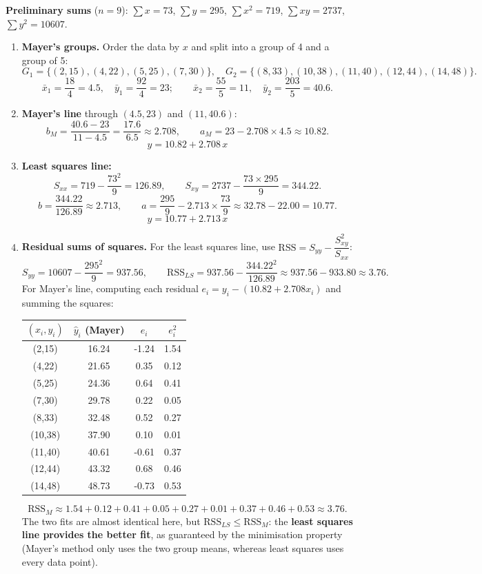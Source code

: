 \documentclass[11pt]{article}
\begin{document}
\begin{corrige}
\textbf{Preliminary sums} ($n = 9$): $\sum x = 73$, $\sum y = 295$, $\sum x^2 = 719$, $\sum xy = 2737$, $\sum y^2 = 10607$.
\begin{enumerate}
\item \textbf{Mayer's groups.} Order the data by $x$ and split into a group of 4 and a group of 5:
\[
G_1 = \{(2,15),(4,22),(5,25),(7,30)\}, \quad G_2 = \{(8,33),(10,38),(11,40),(12,44),(14,48)\}.
\]
\[
\bar{x}_1 = \frac{18}{4} = 4.5,\quad \bar{y}_1 = \frac{92}{4} = 23; \qquad
\bar{x}_2 = \frac{55}{5} = 11,\quad \bar{y}_2 = \frac{203}{5} = 40.6.
\]
\item \textbf{Mayer's line} through $(4.5, 23)$ and $(11, 40.6)$:
\[
b_M = \frac{40.6 - 23}{11 - 4.5} = \frac{17.6}{6.5} \approx 2.708, \qquad a_M = 23 - 2.708 \times 4.5 \approx 10.82.
\]
\[
\boxed{y = 10.82 + 2.708\,x}
\]
\item \textbf{Least squares line:}
\[
S_{xx} = 719 - \frac{73^2}{9} = 126.89, \qquad S_{xy} = 2737 - \frac{73 \times 295}{9} = 344.22.
\]
\[
b = \frac{344.22}{126.89} \approx 2.713, \qquad a = \frac{295}{9} - 2.713 \times \frac{73}{9} \approx 32.78 - 22.00 = 10.77.
\]
\[
\boxed{y = 10.77 + 2.713\,x}
\]
\item \textbf{Residual sums of squares.} For the least squares line, use $\mathrm{RSS} = S_{yy} - \dfrac{S_{xy}^2}{S_{xx}}$:
\[
S_{yy} = 10607 - \frac{295^2}{9} = 937.56, \qquad \mathrm{RSS}_{LS} = 937.56 - \frac{344.22^2}{126.89} \approx 937.56 - 933.80 \approx 3.76.
\]
For Mayer's line, computing each residual $e_i = y_i - (10.82 + 2.708x_i)$ and summing the squares:
\begin{center}
\begin{tabular}{|c|c|c|c|}
\hline
$(x_i,y_i)$ & $\hat{y}_i$ (Mayer) & $e_i$ & $e_i^2$ \\
\hline
(2,15) & 16.24 & -1.24 & 1.54 \\
(4,22) & 21.65 & 0.35 & 0.12 \\
(5,25) & 24.36 & 0.64 & 0.41 \\
(7,30) & 29.78 & 0.22 & 0.05 \\
(8,33) & 32.48 & 0.52 & 0.27 \\
(10,38) & 37.90 & 0.10 & 0.01 \\
(11,40) & 40.61 & -0.61 & 0.37 \\
(12,44) & 43.32 & 0.68 & 0.46 \\
(14,48) & 48.73 & -0.73 & 0.53 \\
\hline
\end{tabular}
\end{center}
\[
\mathrm{RSS}_{M} \approx 1.54 + 0.12 + 0.41 + 0.05 + 0.27 + 0.01 + 0.37 + 0.46 + 0.53 \approx 3.76.
\]
The two fits are almost identical here, but $\mathrm{RSS}_{LS} \le \mathrm{RSS}_{M}$: the \textbf{least squares line provides the better fit}, as guaranteed by the minimisation property (Mayer's method only uses the two group means, whereas least squares uses every data point).
\end{enumerate}
\end{corrige}
\end{document}
